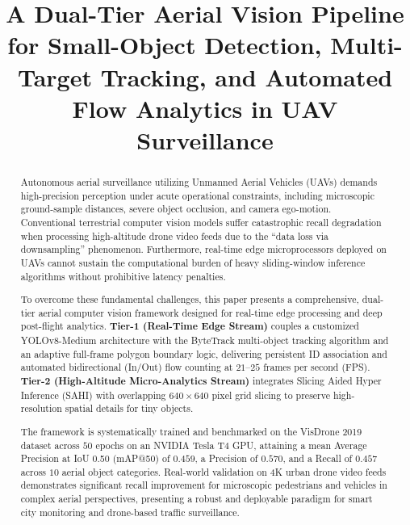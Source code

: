 \documentclass[conference]{IEEEtran}
\begin{document}
\title{A Dual-Tier Aerial Vision Pipeline for Small-Object Detection, Multi-Target Tracking, and Automated Flow Analytics in UAV Surveillance}

\author{
}

\maketitle

\begin{abstract}
Autonomous aerial surveillance utilizing Unmanned Aerial Vehicles (UAVs) demands high-precision perception under acute operational constraints, including microscopic ground-sample distances, severe object occlusion, and camera ego-motion. Conventional terrestrial computer vision models suffer catastrophic recall degradation when processing high-altitude drone video feeds due to the ``data loss via downsampling'' phenomenon. Furthermore, real-time edge microprocessors deployed on UAVs cannot sustain the computational burden of heavy sliding-window inference algorithms without prohibitive latency penalties. 

To overcome these fundamental challenges, this paper presents a comprehensive, dual-tier aerial computer vision framework designed for real-time edge processing and deep post-flight analytics. \textbf{Tier-1 (Real-Time Edge Stream)} couples a customized YOLOv8-Medium architecture with the ByteTrack multi-object tracking algorithm and an adaptive full-frame polygon boundary logic, delivering persistent ID association and automated bidirectional (In/Out) flow counting at $21$--$25$ frames per second (FPS). \textbf{Tier-2 (High-Altitude Micro-Analytics Stream)} integrates Slicing Aided Hyper Inference (SAHI) with overlapping $640\times 640$ pixel grid slicing to preserve high-resolution spatial details for tiny objects. 

The framework is systematically trained and benchmarked on the VisDrone 2019 dataset across $50$ epochs on an NVIDIA Tesla T4 GPU, attaining a mean Average Precision at IoU 0.50 (mAP@50) of $0.459$, a Precision of $0.570$, and a Recall of $0.457$ across $10$ aerial object categories. Real-world validation on 4K urban drone video feeds demonstrates significant recall improvement for microscopic pedestrians and vehicles in complex aerial perspectives, presenting a robust and deployable paradigm for smart city monitoring and drone-based traffic surveillance.
\end{abstract}
\end{document}
